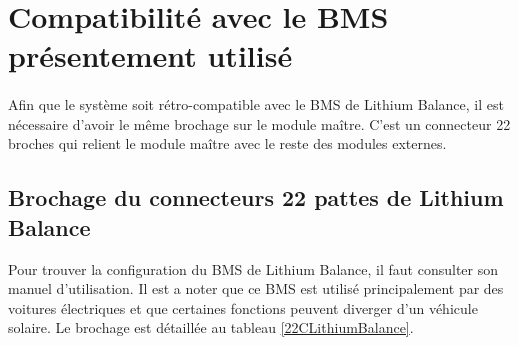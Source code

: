 \section{Compatibilité avec le BMS présentement utilisé}
	\paragraph*{}	
	Afin que le système soit rétro-compatible avec le BMS de Lithium Balance, il est nécessaire d'avoir le même brochage sur le module maître. C'est un connecteur 22 broches qui relient le module maître avec le reste des modules externes.

	\subsection{Brochage du connecteurs 22 pattes de Lithium Balance}
	
	Pour trouver la configuration du BMS de Lithium Balance, il faut consulter son manuel d'utilisation. Il est a noter que ce BMS est utilisé principalement par des voitures électriques et que certaines fonctions peuvent diverger d'un véhicule solaire. Le brochage est détaillée au tableau \ref{22CLithiumBalance}.
	
